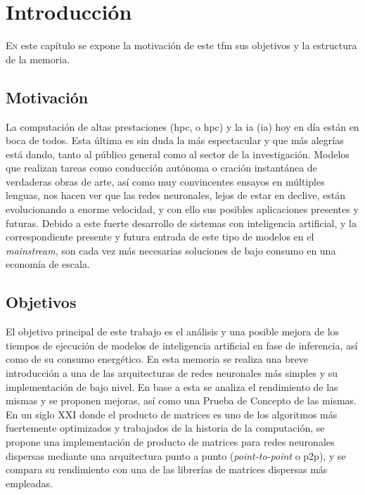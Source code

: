 \chapter{Introducción}
\label{chap:introducion}

\lettrine{E}{n} este capítulo se expone la motivación de este \acrlong{tfm} sus objetivos y la estructura de la memoria.

\section{Motivación}
\label{sec:motivacion}
La computación de altas prestaciones (\acrshort{hpc}, o \acrlong{hpc}) y la \acrlong{ia} (\acrshort{ia}) hoy en día están en boca de todos. Esta última es sin duda la más espectacular y que más alegrías está dando, tanto al público general como al sector de la investigación.
Modelos que realizan tareas como conducción autónoma o cración instantánea de verdaderas obras de arte, así como muy convincentes ensayos en múltiples lenguas, nos hacen ver que las redes neuronales, lejos de estar en declive, están evolucionando a enorme velocidad, y con ello sus posibles aplicaciones presentes y futuras. Debido a este fuerte desarrollo de sistemas con inteligencia artificial, y la correspondiente presente y futura entrada de este tipo de modelos en el \textit{mainstream}, son cada vez más necesarias soluciones de bajo consumo en una economía de escala.

\section{Objetivos}
\label{sec:objetivos}
El objetivo principal de este trabajo es el análisis y una posible mejora de los tiempos de ejecución de modelos de inteligencia artificial en fase de inferencia, así como de su consumo energético. En esta memoria se realiza una breve introducción a una de las arquitecturas de redes neuronales más simples y su implementación de bajo nivel. En base a esta se analiza el rendimiento de las mismas y se proponen mejoras, así como una Prueba de Concepto de las mismas. En un siglo XXI donde el producto de matrices es uno de los algoritmos más fuertemente optimizados y trabajados de la historia de la computación, se propone una implementación de producto de matrices para redes neuronales dispersas mediante una arquitectura punto a punto (\textit{point-to-point} o p2p), y se compara su rendimiento con una de las librerías de matrices dispersas más empleadas.

